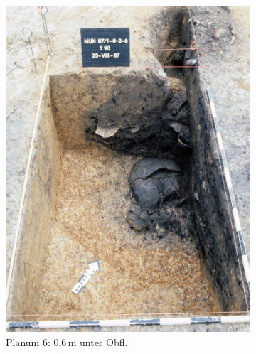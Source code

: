 \begin{figure}[p]
\begin{subfigure}[t]{0.32\textwidth}
		\includegraphics[width = \textwidth]{fig/MUN87-102_Pl6_E87-042-8.jpg}
		\caption{Planum 6: 0,6\,m unter Obfl.}
		\label{fig:MUN87-1-0-2_Pl_6}
	\end{subfigure}\hfill
	\begin{subfigure}[t]{0.32\textwidth}
		\centering

\end{subfigure}
\end{figure}
